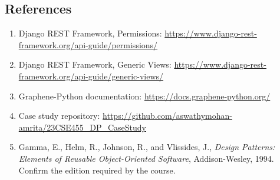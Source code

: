 \documentclass[11pt,a4paper]{article}
\begin{document}
\subsection{References}

\begin{enumerate}[leftmargin=*]
    \item Django REST Framework, Permissions:
    \url{https://www.django-rest-framework.org/api-guide/permissions/}

    \item Django REST Framework, Generic Views:
    \url{https://www.django-rest-framework.org/api-guide/generic-views/}

    \item Graphene-Python documentation:
    \url{https://docs.graphene-python.org/}

    \item Case study repository:
    \url{https://github.com/aswathymohan-amrita/23CSE455_DP_CaseStudy}

    \item Gamma, E., Helm, R., Johnson, R., and Vlissides, J.,
    \textit{Design Patterns: Elements of Reusable Object-Oriented Software},
    Addison-Wesley, 1994. Confirm the edition required by the course.
\end{enumerate}
\end{document}
